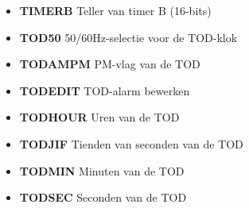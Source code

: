 \begin{itemize}
\item{\bf{TIMERB}} Teller van timer B (16-bits)
\item{\bf{TOD50}} 50/60Hz-selectie voor de TOD-klok
\item{\bf{TODAMPM}} PM-vlag van de TOD
\item{\bf{TODEDIT}} TOD-alarm bewerken
\item{\bf{TODHOUR}} Uren van de TOD
\item{\bf{TODJIF}} Tienden van seconden van de TOD
\item{\bf{TODMIN}} Minuten van de TOD
\item{\bf{TODSEC}} Seconden van de TOD
\end{itemize}
